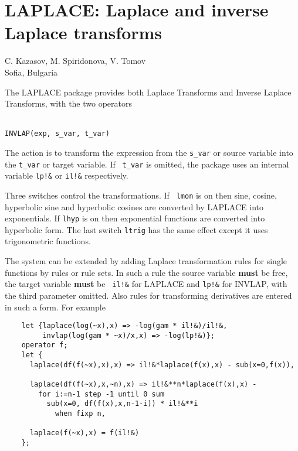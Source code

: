 \chapter[LAPLACE: Laplace transforms etc.]%
        {LAPLACE: Laplace and inverse Laplace transforms}
\label{LAPLACE}

{\footnotesize
\begin{center}
C. Kazasov, M. Spiridonova, V. Tomov \\
Sofia, Bulgaria %
\end{center}
}

The LAPLACE package provides both Laplace Transforms and Inverse
Laplace Transforms, with the two operators

 \\
{\tt INVLAP(exp, s\_var, t\_var)}

The action is to transform the expression from the {\tt s\_var} or
source variable into the {\tt t\_var} or target variable.  If {\tt
t\_var} is omitted, the package uses an internal variable {\tt lp!\&} or
{\tt il!\&} respectively. 

Three switches control the transformations.  If {\tt
lmon} is on then sine, cosine, hyperbolic sine and
hyperbolic cosines are converted by LAPLACE into exponentials.  If
{\tt lhyp} is on then exponential functions are converted into
hyperbolic form.   The last switch {\tt ltrig} has the
same effect except it uses trigonometric functions.

The system can be extended by adding Laplace transformation rules for
single functions by rules or rule sets.  In such a rule the source
variable {\bf must} be free, the target variable {\bf must} be {\tt
il!\&} for LAPLACE and {\tt lp!\&} for INVLAP, with the third parameter
omitted.  Also rules for transforming derivatives are entered in such
a form.  For example 
\begin{verbatim}
    let {laplace(log(~x),x) => -log(gam * il!&)/il!&,
         invlap(log(gam * ~x)/x,x) => -log(lp!&)};
    operator f;
    let {
      laplace(df(f(~x),x),x) => il!&*laplace(f(x),x) - sub(x=0,f(x)),

      laplace(df(f(~x),x,~n),x) => il!&**n*laplace(f(x),x) -
        for i:=n-1 step -1 until 0 sum
          sub(x=0, df(f(x),x,n-1-i)) * il!&**i
            when fixp n,

      laplace(f(~x),x) = f(il!&)
    };
\end{verbatim}

